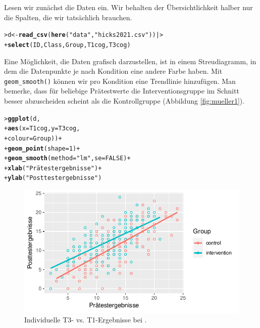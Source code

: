 \documentclass[oneside, 10pt]{book}\usepackage[]{graphicx}\usepackage[]{xcolor}
\makeatletter
\newcommand{\hlnum}[1]{\textcolor[rgb]{0.686,0.059,0.569}{#1}}%
\newcommand{\hlstr}[1]{\textcolor[rgb]{0.192,0.494,0.8}{#1}}%
\newcommand{\hlopt}[1]{\textcolor[rgb]{0,0,0}{#1}}%
\newcommand{\hlstd}[1]{\textcolor[rgb]{0.345,0.345,0.345}{#1}}%
\newcommand{\hlkwb}[1]{\textcolor[rgb]{0.69,0.353,0.396}{#1}}%
\newcommand{\hlkwc}[1]{\textcolor[rgb]{0.333,0.667,0.333}{#1}}%
\newcommand{\hlkwd}[1]{\textcolor[rgb]{0.737,0.353,0.396}{\textbf{#1}}}%
\newenvironment{kframe}{%
 \def\at@end@of@kframe{}%
 \ifinner\ifhmode%
  \def\at@end@of@kframe{\end{minipage}}%
  \begin{minipage}{\columnwidth}%
 \fi\fi%
 \def\FrameCommand##1{\hskip\@totalleftmargin \hskip-\fboxsep
 \colorbox{shadecolor}{##1}\hskip-\fboxsep
     \hskip-\linewidth \hskip-\@totalleftmargin \hskip\columnwidth}%
 \MakeFramed {\advance\hsize-\width
   \@totalleftmargin\z@ \linewidth\hsize
   \@setminipage}}%
 {\par\unskip\endMakeFramed%
 \at@end@of@kframe}
\newenvironment{knitrout}{}{} %
\makeatother
\begin{document}
  Lesen wir zunächst die Daten ein. Wir behalten der Übersichtlichkeit
  halber nur die Spalten, die wir tatsächlich brauchen.
\begin{knitrout}
\color{fgcolor}\begin{kframe}
\begin{alltt}
\hlstd{> }\hlstd{d} \hlkwb{<-} \hlkwd{read_csv}\hlstd{(}\hlkwd{here}\hlstd{(}\hlstr{"data"}\hlstd{,} \hlstr{"hicks2021.csv"}\hlstd{)) |>}
\hlstd{+ }  \hlkwd{select}\hlstd{(ID, Class, Group, T1cog, T3cog)}
\end{alltt}
\end{kframe}
\end{knitrout}
Eine Möglichkeit, die Daten grafisch darzustellen, ist in einem
Streudiagramm, in dem die Datenpunkte je nach Kondition eine
andere Farbe haben. Mit \texttt{geom\_smooth()} können wir pro Kondition
eine Trendlinie hinzufügen. Man bemerke, dass für beliebige Prätestwerte
die Interventionsgruppe im Schnitt besser abzuscheiden scheint als
die Kontrollgruppe (Abbildung \ref{fig:mueller1}).
\begin{knitrout}
\color{fgcolor}\begin{kframe}
\begin{alltt}
\hlstd{> }\hlkwd{ggplot}\hlstd{(d,}
\hlstd{+ }       \hlkwd{aes}\hlstd{(}\hlkwc{x} \hlstd{= T1cog,} \hlkwc{y} \hlstd{= T3cog,}
\hlstd{+ }           \hlkwc{colour} \hlstd{= Group))} \hlopt{+}
\hlstd{+ }  \hlkwd{geom_point}\hlstd{(}\hlkwc{shape} \hlstd{=} \hlnum{1}\hlstd{)} \hlopt{+}
\hlstd{+ }  \hlkwd{geom_smooth}\hlstd{(}\hlkwc{method} \hlstd{=} \hlstr{"lm"}\hlstd{,} \hlkwc{se} \hlstd{=} \hlnum{FALSE}\hlstd{)} \hlopt{+}
\hlstd{+ }  \hlkwd{xlab}\hlstd{(}\hlstr{"Prätestergebnisse"}\hlstd{)} \hlopt{+}
\hlstd{+ }  \hlkwd{ylab}\hlstd{(}\hlstr{"Posttestergebnisse"}\hlstd{)}
\end{alltt}
\end{kframe}\begin{figure}[tp]

{\centering \includegraphics[width=.7\textwidth]{figs/unnamed-chunk-325-1} 

}

\caption{Individuelle T3- vs. T1-Ergebnisse bei \citet{Hicks2021}.\label{fig:mueller1}}\label{fig:unnamed-chunk-325}
\end{figure}

\end{knitrout}
\end{document}
